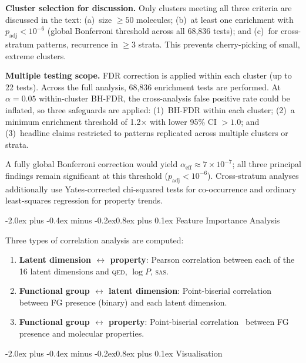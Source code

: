 \documentclass[10pt,a4paper,twocolumn]{article}
\makeatletter
\providecommand{\qed}{}
\let\qed\relax
\newcommand{\qedscore}{\textsc{qed}}
\let\qed\qedscore
\newcommand{\sas}{\textsc{sas}}
\newcommand{\logp}{\ensuremath{\log P}}
\renewcommand\subsection{\@startsection{subsection}{2}{\z@}%
  {-2.0ex plus -0.4ex minus -0.2ex}{0.8ex plus 0.1ex}%
  {\normalfont\large\bfseries}}
\makeatother
\begin{document}
\textbf{Cluster selection for discussion.} Only clusters meeting all three criteria are discussed in the text: (a)~size $\geq 50$ molecules; (b)~at least one enrichment with $p_{\mathrm{adj}} < 10^{-6}$ (global Bonferroni threshold across all 68,836 tests); and (c)~for cross-stratum patterns, recurrence in $\geq$3 strata. This prevents cherry-picking of small, extreme clusters.

\textbf{Multiple testing scope.} FDR correction is applied within each cluster (up to 22 tests). Across the full analysis, 68,836 enrichment tests are performed. At $\alpha = 0.05$ within-cluster BH-FDR, the cross-analysis false positive rate could be inflated, so three safeguards are applied: (1)~BH-FDR within each cluster; (2)~a minimum enrichment threshold of 1.2$\times$ with lower 95\% CI $> 1.0$; and (3)~headline claims restricted to patterns replicated across multiple clusters or strata.

A fully global Bonferroni correction would yield $\alpha_{\text{eff}} \approx 7 \times 10^{-7}$; all three principal findings remain significant at this threshold ($p_{\mathrm{adj}} < 10^{-6}$). Cross-stratum analyses additionally use Yates-corrected chi-squared tests for co-occurrence and ordinary least-squares regression for property trends.

\subsection{Feature Importance Analysis}

Three types of correlation analysis are computed:
\begin{enumerate}
    \item \textbf{Latent dimension $\leftrightarrow$ property}: Pearson correlation between each of the 16 latent dimensions and \qed{}, $\logp{}$, \sas{}.
    \item \textbf{Functional group $\leftrightarrow$ latent dimension}: Point-biserial correlation between FG presence (binary) and each latent dimension.
    \item \textbf{Functional group $\leftrightarrow$ property}: Point-biserial correlation~\cite{tate1954} between FG presence and molecular properties.
\end{enumerate}

\subsection{Visualisation}
\end{document}
